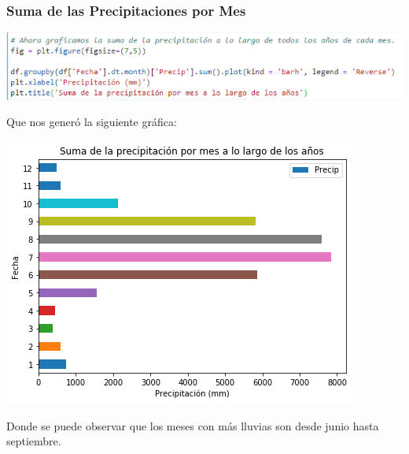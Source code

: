 \documentclass{article}
\begin{document}
\subsubsection{Suma de las Precipitaciones por Mes}
\begin{center}
    \includegraphics[scale = 0.80]{SumPrecip.png}
\end{center}
Que nos generó la siguiente gráfica:
\begin{center}
    \includegraphics[scale = 0.55]{GSumPrecip.png}
\end{center}
Donde se puede observar que los meses con más lluvias son desde junio hasta septiembre.
\end{document}
